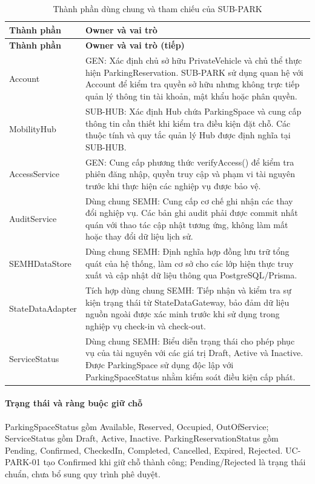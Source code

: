 \begin{longtable}{|L{37mm}|L{102mm}|}
\caption{Thành phần dùng chung và tham chiếu của SUB-PARK}\\\hline
\textbf{Thành phần} & \textbf{Owner và vai trò}\\\hline
\endfirsthead
\hline\textbf{Thành phần} & \textbf{Owner và vai trò (tiếp)}\\\hline\endhead
Account & GEN: Xác định chủ sở hữu PrivateVehicle và chủ thể thực hiện Parking\allowbreak Reservation. SUB-PARK sử dụng quan hệ với Account để kiểm tra quyền sở hữu nhưng không trực tiếp quản lý thông tin tài khoản, mật khẩu hoặc phân quyền.\\\hline
MobilityHub & SUB-HUB: Xác định Hub chứa ParkingSpace và cung cấp thông tin cần thiết khi kiểm tra điều kiện đặt chỗ. Các thuộc tính và quy tắc quản lý Hub được định nghĩa tại SUB-HUB.\\\hline
AccessService & GEN: Cung cấp phương thức verifyAccess() để kiểm tra phiên đăng nhập, quyền truy cập và phạm vi tài nguyên trước khi thực hiện các nghiệp vụ được bảo vệ.\\\hline
AuditService & Dùng chung SEMH: Cung cấp cơ chế ghi nhận các thay đổi nghiệp vụ. Các bản ghi audit phải được commit nhất quán với thao tác cập nhật tương ứng, không làm mất hoặc thay đổi dữ liệu lịch sử.\\\hline
SEMHDataStore & Dùng chung SEMH: Định nghĩa hợp đồng lưu trữ tổng quát của hệ thống, làm cơ sở cho các lớp hiện thực truy xuất và cập nhật dữ liệu thông qua PostgreSQL/Prisma.\\\hline
StateDataAdapter & Tích hợp dùng chung SEMH: Tiếp nhận và kiểm tra sự kiện trạng thái từ StateDataGateway, bảo đảm dữ liệu nguồn ngoài được xác minh trước khi sử dụng trong nghiệp vụ check-in và check-out.\\\hline
ServiceStatus & Dùng chung SEMH: Biểu diễn trạng thái cho phép phục vụ của tài nguyên với các giá trị Draft, Active và Inactive. Được ParkingSpace sử dụng độc lập với Parking\allowbreak Space\allowbreak Status nhằm kiểm soát điều kiện cấp phát.\\\hline
\end{longtable}

\paragraph{Trạng thái và ràng buộc giữ chỗ}
ParkingSpaceStatus gồm Available, Reserved, Occupied, OutOfService; ServiceStatus gồm Draft, Active, Inactive. ParkingReservationStatus gồm Pending, Confirmed, CheckedIn, Completed, Cancelled, Expired, Rejected. UC-PARK-01 tạo Confirmed khi giữ chỗ thành công; Pending/Rejected là trạng thái chuẩn, chưa bổ sung quy trình phê duyệt.

